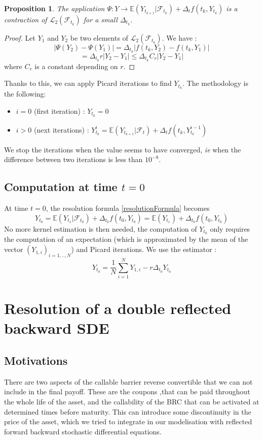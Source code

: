 \documentclass[a4paper,11pt,english]{book}
\newtheorem{prop}{Proposition}
\begin{document}
\begin{prop}
The application $\Psi : Y \rightarrow \mathbb{E}(Y_{t_{k+1}}|\mathcal{F}_{t_{k}}) + \Delta_{t}f(t_{k},Y_{t_{k}})$ is a contraction of $\mathcal{L}_{2}(\mathcal{F}_{t_{k}})$ for a small $\Delta_{t_{k}}$.
\end{prop}

\begin{proof}
Let $Y_{1}$ and $Y_{2}$ be two elements of $\mathcal{L}_{2}(\mathcal{F}_{t_{k}})$. We have : $$|\Psi(Y_{2})-\Psi(Y_{1})|=\Delta_{t_{k}}|f(t_{k},Y_{2})-f(t_{k},Y_{1})|$$
$$=\Delta_{t_{k}}r |Y_{2}-Y_{1}|\leq \Delta_{t_{k}} C_{r}|Y_{2}-Y_{1}|$$
where $C_{r}$ is a constant depending on $r$.
\end{proof}
Thanks to this, we can apply Picard iterations to find $Y_{t_{k}}$. The methodology is the following:
\begin{itemize}
    \item $i=0$ (first iteration) : $Y_{t_{k}}=0$
    \item $i>0$ (next iterations) : $Y_{t_{k}}^{i}=\mathbb{E}(Y_{t_{k+1}}|\mathcal{F}_{t}) + \Delta_{t}f(t_{k},Y_{t_{k}}^{i-1})$
\end{itemize}
We stop the iterations when the value seems to have converged, \textit{ie} when the difference between two iterations is less than $10^{-8}$.
\subsection{Computation at time $t=0$}
\label{subsec:computation-0}
At time $t=0$, the resolution formula \eqref{resolutionFormula} becomes $$Y_{t_{0}} = \mathbb{E}(Y_{t_{1}}|\mathcal{F}_{t_{0}}) + \Delta_{t_{0}}f(t_{0},Y_{t_{0}})=\mathbb{E}(Y_{t_{1}}) + \Delta_{t_{0}}f(t_{0},Y_{t_{0}})$$
No more kernel estimation is then needed, the computation of $Y_{t_{0}}$ only requires the computation of an expectation (which is approximated by the mean of the vector $(Y_{1,i})_{i=1,..,N}$) and Picard iterations. We use the estimator :
$$Y_{t_{0}} = \frac{1}{N}\sum_{i=1}^{N}Y_{1,i}-r\Delta_{t_{0}}Y_{t_{0}}$$
\section{Resolution of a double reflected backward SDE}
\subsection{Motivations}
There are two aspects of the callable barrier reverse convertible that we can not include in the final payoff. These are the coupons ,that can be paid throughout the whole life of the asset, and the callability of the BRC that can be activated at determined times before maturity. This can introduce some discontinuity in the price of the asset, which we tried to integrate in our modelisation with reflected forward backward stochastic differential equations.
\end{document}
